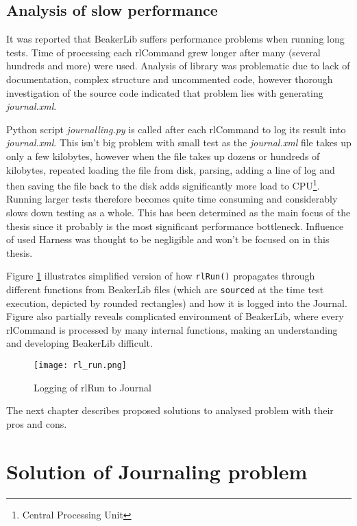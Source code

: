 \section{Analysis of slow performance}
It was reported that BeakerLib suffers performance problems when running long tests. Time of processing each rlCommand grew longer after many (several hundreds and more) were used. Analysis of library was problematic due to lack of documentation, complex structure and uncommented code, however thorough investigation of the source code indicated that problem lies with generating \textit{journal.xml}. 

Python script \textit{journalling.py} is called after each rlCommand to log its result into \textit{journal.xml}. This isn't big problem with small test as the \textit{journal.xml} file takes up only a few kilobytes, however when the file takes up dozens or hundreds of kilobytes, repeated loading the file from disk, parsing, adding a line of log and then saving the file back to the disk adds significantly more load to CPU\footnote{Central Processing Unit}. Running larger tests therefore becomes quite time consuming and considerably slows down testing as a whole.
This has been determined as the main focus of the thesis since it probably is the most significant performance bottleneck. Influence of used Harness was thought  to be negligible and won't be focused on in this thesis.

Figure \ref{fig:rl_run} illustrates simplified version of how \texttt{rlRun()} propagates through different functions from BeakerLib files (which are \texttt{sourced} at the time test execution,  depicted by rounded rectangles) and how it is logged into the Journal. Figure also partially reveals complicated environment of BeakerLib, where every rlCommand is processed by many internal functions, making an understanding and developing BeakerLib difficult. 

\begin{figure}[h!]
  \texttt{[image: rl\_run.png]}
  \caption{Logging of rlRun to Journal}
  \label{fig:rl_run}
\end{figure}


The next chapter describes proposed solutions to analysed problem with their pros and cons.


\chapter{Solution of Journaling problem}
\label{solutions}

